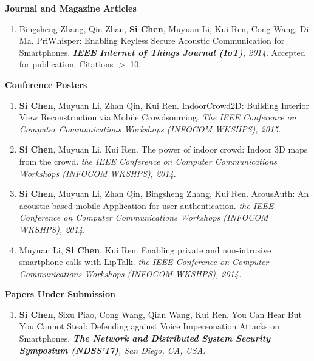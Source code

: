 \documentclass[letter]{article}
\newcommand{\publication}[4]{\item #1. #2. \emph{#3.} #4}
\begin{document}
\begin{description}
\begin{enumerate}[{C-}1.]

\end{enumerate}

\textbf{Journal and Magazine Articles}

\begin{enumerate}[{J-}1.]



\publication{Bingsheng Zhang, Qin Zhan, \textbf{Si Chen}, Muyuan Li, Kui Ren, Cong Wang, Di Ma} {PriWhisper: Enabling Keyless Secure Acoustic Communication for Smartphones}
{\textbf{IEEE Internet of Things Journal (IoT)}, 2014}
{Accepted for publication. Citations $>$ 10}.

\end{enumerate}
\textbf{Conference Posters}


\begin{enumerate}[{P-}1.]

\publication{\textbf{Si Chen}, Muyuan Li, Zhan Qin, Kui Ren} {IndoorCrowd2D: Building Interior View Reconstruction via Mobile Crowdsourcing}
{The IEEE Conference on Computer Communications Workshops (INFOCOM WKSHPS), 2015}{}

\publication{\textbf{Si Chen}, Muyuan Li, Kui Ren} {The power of indoor crowd: Indoor 3D maps from the crowd}
{the IEEE Conference on Computer Communications Workshops (INFOCOM WKSHPS), 2014}{}

\publication{\textbf{Si Chen}, Muyuan Li, Zhan Qin, Bingsheng Zhang, Kui Ren} {AcousAuth: An acoustic-based mobile Application for user authentication}
{the IEEE Conference on Computer Communications Workshops (INFOCOM WKSHPS), 2014}{}

\publication{Muyuan Li, \textbf{Si Chen}, Kui Ren} {Enabling private and non-intrusive smartphone calls with LipTalk}
{the IEEE Conference on Computer Communications Workshops (INFOCOM WKSHPS), 2014}{}

\end{enumerate}

\textbf{Papers Under Submission}
\begin{enumerate}[{U-}1.]
\publication{\textbf{Si Chen}, Sixu Piao, Cong Wang, Qian Wang, Kui Ren} {You Can Hear But You Cannot Steal: Defending against Voice Impersonation Attacks on Smartphones}  {\textbf{The Network and Distributed System Security Symposium (NDSS'17)}, San Diego, CA, USA} \\


\end{enumerate}
\end{description}
\end{document}
